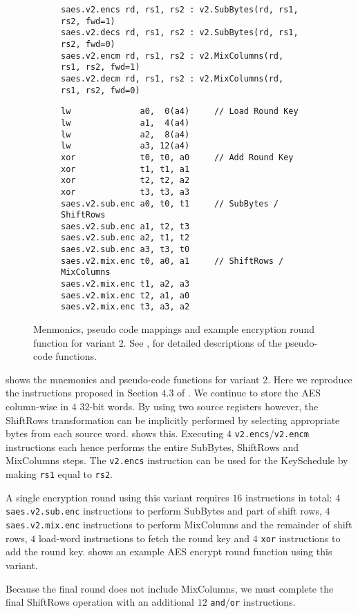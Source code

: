 
\begin{figure}
\begin{subfigure}{\textwidth}
\begin{lstlisting}[language=pseudo,style=block]
saes.v2.encs rd, rs1, rs2 : v2.SubBytes(rd, rs1, rs2, fwd=1)
saes.v2.decs rd, rs1, rs2 : v2.SubBytes(rd, rs1, rs2, fwd=0)
saes.v2.encm rd, rs1, rs2 : v2.MixColumns(rd, rs1, rs2, fwd=1)
saes.v2.decm rd, rs1, rs2 : v2.MixColumns(rd, rs1, rs2, fwd=0)
\end{lstlisting}
\caption{
}
\label{fig:mnemonics:v2}
\end{subfigure}
\begin{subfigure}{\textwidth}
\begin{lstlisting}[language=pseudo,style=block]
lw              a0,  0(a4)     // Load Round Key
lw              a1,  4(a4)
lw              a2,  8(a4)
lw              a3, 12(a4)
xor             t0, t0, a0     // Add Round Key
xor             t1, t1, a1
xor             t2, t2, a2
xor             t3, t3, a3
saes.v2.sub.enc a0, t0, t1     // SubBytes / ShiftRows
saes.v2.sub.enc a1, t2, t3
saes.v2.sub.enc a2, t1, t2
saes.v2.sub.enc a3, t3, t0
saes.v2.mix.enc t0, a0, a1     // ShiftRows / MixColumns
saes.v2.mix.enc t1, a2, a3
saes.v2.mix.enc t2, a1, a0
saes.v2.mix.enc t3, a3, a2
\end{lstlisting}
\caption{
}
\label{fig:round:v2}
\end{subfigure}
\caption{
    Menmonics, pseudo code mappings and example encryption
    round function for variant 2.
    See ,  for detailed
    descriptions of the pseudo-code functions.
}
\end{figure}

 shows the mnemonics and pseudo-code functions
for variant 2.
Here we reproduce the instructions proposed in Section $4.3$ of
\cite{TilGro:06}.
We continue to store the AES column-wise in $4$ $32$-bit words.
By using two source registers however,
the ShiftRows transformation can be implicitly performed by selecting
appropriate bytes from each source word.
shows this.
Executing $4$  {\tt v2.encs}/{\tt v2.encm} instructions each hence
performs the entire SubBytes, ShiftRows and MixColumns steps.
The {\tt v2.encs} instruction can be used for the KeySchedule by
making {\tt rs1} equal to {\tt rs2}.

A single encryption round using this variant requires $16$ instructions
in total:
$4$ {\tt saes.v2.sub.enc} instructions to perform SubBytes and part of
shift rows,
$4$ {\tt saes.v2.mix.enc} instructions to perform MixColumns and the
remainder of shift rows,
$4$ load-word instructions to fetch the round key
and
$4$ {\tt xor} instructions to add the round key.
 shows an example AES encrypt round function
using this variant.

Because the final round does not include MixColumns, we must
complete the final ShiftRows operation with an additional
$12$ {\tt and}/{\tt or} instructions.

